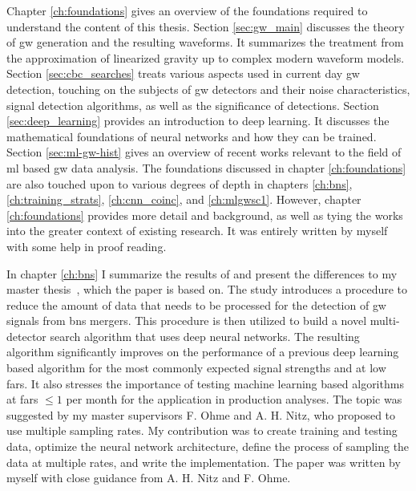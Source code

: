 Chapter \ref{ch:foundations} gives an overview of the foundations required to understand the content of this thesis. Section \ref{sec:gw_main} discusses the theory of \acrshort{gw} generation and the resulting waveforms. It summarizes the treatment from the approximation of linearized gravity up to complex modern waveform models. Section \ref{sec:cbc_searches} treats various aspects used in current day \acrshort{gw} detection, touching on the subjects of \acrshort{gw} detectors and their noise characteristics, signal detection algorithms, as well as the significance of detections. Section \ref{sec:deep_learning} provides an introduction to deep learning. It discusses the mathematical foundations of neural networks and how they can be trained. Section \ref{sec:ml-gw-hist} gives an overview of recent works relevant to the field of \acrshort{ml} based \acrshort{gw} data analysis. The foundations discussed in chapter \ref{ch:foundations} are also touched upon to various degrees of depth in chapters \ref{ch:bns}, \ref{ch:training_strats}, \ref{ch:cnn_coinc}, and \ref{ch:mlgwsc1}. However, chapter \ref{ch:foundations} provides more detail and background, as well as tying the works into the greater context of existing research. It was entirely written by myself with some help in proof reading.

In chapter \ref{ch:bns} I summarize the results of \cite{Schafer:2020kor} and present the differences to my master thesis~\cite{Schaefer:2019:MSC}, which the paper is based on. The study introduces a procedure to reduce the amount of data that needs to be processed for the detection of \acrshort{gw} signals from \acrshort{bns} mergers. This procedure is then utilized to build a novel multi-detector search algorithm that uses deep neural networks. The resulting algorithm significantly improves on the performance of a previous deep learning based algorithm for the most commonly expected signal strengths and at low \acrshort{far}s. It also stresses the importance of testing machine learning based algorithms at \acrshort{far}s $\leq 1$ per month for the application in production analyses. The topic was suggested by my master supervisors F. Ohme and A. H. Nitz, who proposed to use multiple sampling rates. My contribution was to create training and testing data, optimize the neural network architecture, define the process of sampling the data at multiple rates, and write the implementation. The paper was written by myself with close guidance from A. H. Nitz and F. Ohme.

